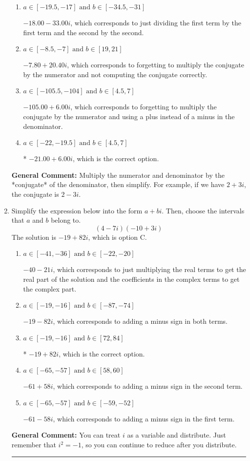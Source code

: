 \documentclass{extbook}[14pt]
\newcommand{\litem}[1]{\item #1

\rule{\textwidth}{0.4pt}}
\begin{document}
\begin{enumerate}
{\begin{enumerate}[label=\Alph*.]
 $-21.00  + 30.00 i$, which corresponds to forgetting to multiply the conjugate by the numerator.
\item \( a \in [-19.5, -17] \text{ and } b \in [-34.5, -31] \)

 $-18.00  - 33.00 i$, which corresponds to just dividing the first term by the first term and the second by the second.
\item \( a \in [-8.5, -7] \text{ and } b \in [19, 21] \)

 $-7.80  + 20.40 i$, which corresponds to forgetting to multiply the conjugate by the numerator and not computing the conjugate correctly.
\item \( a \in [-105.5, -104] \text{ and } b \in [4.5, 7] \)

 $-105.00  + 6.00 i$, which corresponds to forgetting to multiply the conjugate by the numerator and using a plus instead of a minus in the denominator.
\item \( a \in [-22, -19.5] \text{ and } b \in [4.5, 7] \)

* $-21.00  + 6.00 i$, which is the correct option.
\end{enumerate}

\textbf{General Comment:} Multiply the numerator and denominator by the *conjugate* of the denominator, then simplify. For example, if we have $2+3i$, the conjugate is $2-3i$.
}
\litem{
Simplify the expression below into the form $a+bi$. Then, choose the intervals that $a$ and $b$ belong to.
\[ (4 - 7 i)(-10 + 3 i) \]The solution is \( -19 + 82 i \), which is option C.\begin{enumerate}[label=\Alph*.]
\item \( a \in [-41, -36] \text{ and } b \in [-22, -20] \)

 $-40 - 21 i$, which corresponds to just multiplying the real terms to get the real part of the solution and the coefficients in the complex terms to get the complex part.
\item \( a \in [-19, -16] \text{ and } b \in [-87, -74] \)

 $-19 - 82 i$, which corresponds to adding a minus sign in both terms.
\item \( a \in [-19, -16] \text{ and } b \in [72, 84] \)

* $-19 + 82 i$, which is the correct option.
\item \( a \in [-65, -57] \text{ and } b \in [58, 60] \)

 $-61 + 58 i$, which corresponds to adding a minus sign in the second term.
\item \( a \in [-65, -57] \text{ and } b \in [-59, -52] \)

 $-61 - 58 i$, which corresponds to adding a minus sign in the first term.
\end{enumerate}

\textbf{General Comment:} You can treat $i$ as a variable and distribute. Just remember that $i^2=-1$, so you can continue to reduce after you distribute.
}
\end{enumerate}
\end{document}
